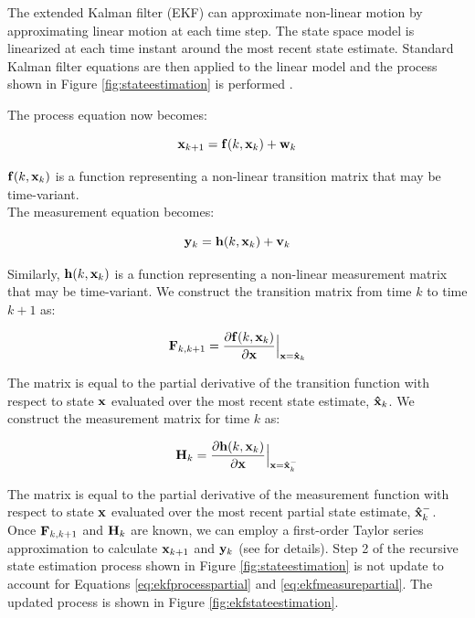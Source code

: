 \documentclass[11pt]{article}
\begin{document}
The extended Kalman filter (EKF) can approximate non-linear motion by approximating linear motion at each time step. The state space model is linearized at each time instant around the most recent state estimate. Standard Kalman filter equations are then applied to the linear model and the process shown in Figure \ref{fig:stateestimation} is performed \cite{kalman}.

The process equation now becomes:

\begin{equation}
{\bf x}_{k+1} = {\bf f}(k,{\bf x}_k) + {\bf w}_k
\label{eq:ekfprocess}
\end{equation}
\vspace{0.01cm}

${\bf f}(k,{\bf x}_k)$ is a function representing a non-linear transition matrix that may be time-variant. \\ 
The measurement equation becomes:

\begin{equation}
{\bf y}_{k} = {\bf h}(k,{\bf x}_k) + {\bf v}_k
\label{eq:ekfmeasure}
\end{equation}
\vspace{0.01cm}

Similarly, ${\bf h}(k,{\bf x}_k)$ is a function representing a non-linear measurement matrix that may be time-variant. We construct the transition matrix from time $k$ to time $k+1$ as:

\begin{equation}
{\bf F}_{k,k+1}  = \frac{\partial{\bf f}(k,{\bf x}_k)}{\partial {\bf x}} \Bigl \vert _{{\bf x} = {\bf \hat x}_k}
\label{eq:ekfprocesspartial}
\end{equation}
\vspace{0.01cm}

The matrix is equal to the partial derivative of the transition function with respect to state ${\bf x}$ evaluated over the most recent state estimate, ${\bf \hat x}_k$. We construct the measurement matrix for time $k$ as:

\begin{equation}
{\bf H}_{k}  = \frac{\partial{\bf h}(k,{\bf x}_k)}{\partial {\bf x}} \Bigl \vert _{{\bf x} = {\bf \hat x}^-_k}
\label{eq:ekfmeasurepartial}
\end{equation}
\vspace{0.01cm}

The matrix is equal to the partial derivative of the measurement function with respect to state ${\bf x}$ evaluated over the most recent partial state estimate, ${\bf \hat x}^-_k$. Once ${\bf F}_{k,k+1} $ and ${\bf H}_{k}$ are known, we can employ a first-order Taylor series approximation to calculate ${\bf x}_{k+1}$ and ${\bf y}_k$ (see \cite{kalman} for details). Step 2 of the recursive state estimation process shown in Figure \ref{fig:stateestimation} is not update to account for Equations \ref{eq:ekfprocesspartial} and \ref{eq:ekfmeasurepartial}. The updated process is shown in Figure \ref{fig:ekfstateestimation}.
\end{document}
